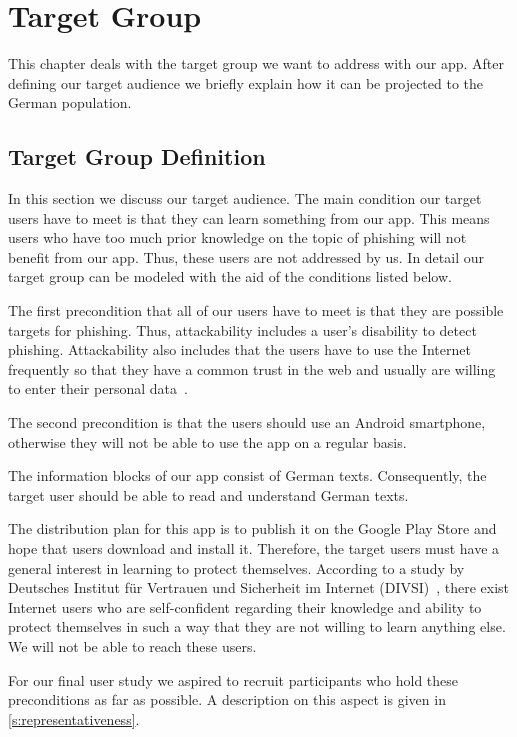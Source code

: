 \section{Target Group}
\label{s:target_group}
This chapter deals with the target group we want to address with our app.
After defining our target audience we briefly explain how it can be projected to the German population.

\subsection{Target Group Definition}
\label{s:target_group_def}
In this section we discuss our target audience.
The main condition our target users have to meet is that they can learn something from our app.
This means users who have too much prior knowledge on the topic of phishing will not benefit from our app.
Thus, these users are not addressed by us.
In detail our target group can be modeled with the aid of the conditions listed below.
\begin{description}[leftmargin=0cm]
\item[Attackability:] The first precondition that all of our users have to meet is that they are possible targets for phishing.
Thus, attackability includes a user's disability to detect phishing.
Attackability also includes that the users have to use the Internet frequently so that they have a common trust in the web and usually are willing to enter their personal data~\cite{divsi2012divsi}.
\item[Android Users:] The second precondition is that the users should use an Android smartphone, otherwise they will not be able to use the app on a regular basis.
\item[Language:] The information blocks of our app consist of German texts.
Consequently, the target user should be able to read and understand German texts.
\item[Motivation:] The distribution plan for this app is to publish it on the Google Play Store and hope that users download and install it.
Therefore, the target users must have a general interest in learning to protect themselves.
 According to a study by Deutsches Institut f\"{u}r Vertrauen und Sicherheit im Internet (DIVSI)~\cite{divsi2012divsi}, there exist Internet users who are self-confident regarding their knowledge and ability to protect themselves in such a way that they are not willing to learn anything else.
We will not be able to reach these users.
\end{description}
For our final user study we aspired to recruit participants who hold these preconditions as far as possible.
A description on this aspect is given in \autoref{s:representativeness}.

